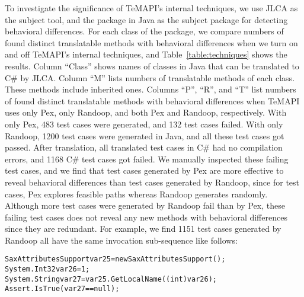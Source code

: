To investigate the significance of TeMAPI's internal techniques, we use JLCA as the subject tool, and the  package in Java as the subject package for detecting behavioral differences. For each class of the package, we compare numbers of found distinct translatable methods with behavioral differences when we turn on and off TeMAPI's internal techniques, and Table~\ref{table:techniques} shows the results. Column ``Class'' shows names of classes in Java that can be translated to C\# by JLCA. Column ``M'' lists numbers of translatable methods of each class. These methods include inherited ones. Columns ``P'', ``R'', and ``T'' list numbers of found distinct translatable methods with behavioral differences when TeMAPI uses only Pex, only Randoop, and both Pex and Randoop, respectively. With only Pex, 483 test cases were generated, and 132 test cases failed. With only Randoop, 1200 test cases were generated in Java, and all these test cases got passed. After translation, all translated test cases in C\# had no compilation errors, and 1168 C\# test cases got failed. We manually inspected these failing test cases, and we find that test cases generated by Pex are more effective to reveal behavioral differences than test cases generated by Randoop, since for test cases, Pex explores feasible paths whereas Randoop generates randomly. Although more test cases were generated by Randoop fail than by Pex, these failing test cases does not reveal any new methods with behavioral differences since they are redundant. For example, we find 1151 test cases generated by Randoop all have the same invocation sub-sequence like follows:

\begin{CodeOut}\vspace*{-1.5ex}
\begin{alltt}
SaxAttributesSupport var25 = new SaxAttributesSupport();
System.Int32 var26 = 1;
System.String var27 = var25.GetLocalName((int) var26);
Assert.IsTrue(var27 == null);
\end{alltt}
\end{CodeOut}\vspace*{-1.5ex}

